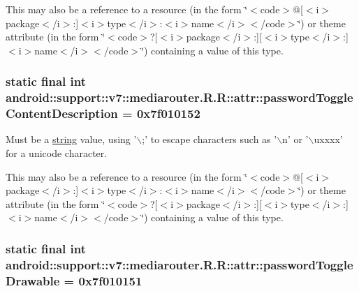 This may also be a reference to a resource (in the form \char`\"{}$<$code$>$@\mbox{[}$<$i$>$package$<$/i$>$:\mbox{]}$<$i$>$type$<$/i$>$:$<$i$>$name$<$/i$>$$<$/code$>$\char`\"{}) or theme attribute (in the form \char`\"{}$<$code$>$?\mbox{[}$<$i$>$package$<$/i$>$:\mbox{]}\mbox{[}$<$i$>$type$<$/i$>$:\mbox{]}$<$i$>$name$<$/i$>$$<$/code$>$\char`\"{}) containing a value of this type. \hypertarget{classandroid_1_1support_1_1v7_1_1mediarouter_1_1_r_1_1attr_241e88115b79c7502fc356491642af22}{
\subsubsection[{passwordToggleContentDescription}]{\setlength{\rightskip}{0pt plus 5cm}static final int android::support::v7::mediarouter.R.R::attr::passwordToggleContentDescription = 0x7f010152}}
\label{classandroid_1_1support_1_1v7_1_1mediarouter_1_1_r_1_1attr_241e88115b79c7502fc356491642af22}


Must be a \hyperlink{classandroid_1_1support_1_1v7_1_1mediarouter_1_1_r_1_1string}{string} value, using '$\backslash$;' to escape characters such as '$\backslash$n' or '$\backslash$uxxxx' for a unicode character. 

This may also be a reference to a resource (in the form \char`\"{}$<$code$>$@\mbox{[}$<$i$>$package$<$/i$>$:\mbox{]}$<$i$>$type$<$/i$>$:$<$i$>$name$<$/i$>$$<$/code$>$\char`\"{}) or theme attribute (in the form \char`\"{}$<$code$>$?\mbox{[}$<$i$>$package$<$/i$>$:\mbox{]}\mbox{[}$<$i$>$type$<$/i$>$:\mbox{]}$<$i$>$name$<$/i$>$$<$/code$>$\char`\"{}) containing a value of this type. \hypertarget{classandroid_1_1support_1_1v7_1_1mediarouter_1_1_r_1_1attr_4316f364de18a870f40de9e2d2a62be9}{
\subsubsection[{passwordToggleDrawable}]{\setlength{\rightskip}{0pt plus 5cm}static final int android::support::v7::mediarouter.R.R::attr::passwordToggleDrawable = 0x7f010151}}
\label{classandroid_1_1support_1_1v7_1_1mediarouter_1_1_r_1_1attr_4316f364de18a870f40de9e2d2a62be9}


